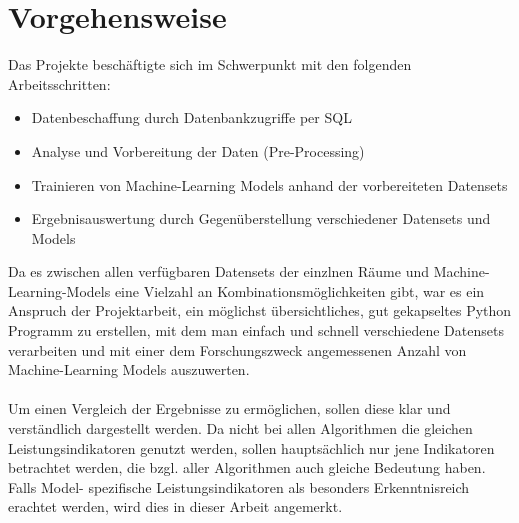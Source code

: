 \newpage

\section{Vorgehensweise}


Das Projekte beschäftigte sich im Schwerpunkt mit den folgenden Arbeitsschritten:
\begin{itemize}
    \item Datenbeschaffung durch Datenbankzugriffe per SQL
    \item Analyse und Vorbereitung der Daten (Pre-Processing)
    \item Trainieren von Machine-Learning Models anhand der vorbereiteten Datensets
    \item Ergebnisauswertung durch Gegenüberstellung verschiedener Datensets und Models
\end{itemize}
Da es zwischen allen verfügbaren Datensets der einzlnen Räume und Machine-Learning-Models eine Vielzahl an
Kombinationsmöglichkeiten gibt, war es ein Anspruch der Projektarbeit, ein möglichst übersichtliches, 
gut gekapseltes Python Programm zu erstellen, mit dem man einfach und schnell verschiedene Datensets  
verarbeiten und mit einer dem Forschungszweck angemessenen Anzahl von Machine-Learning Models auszuwerten. \\\\
Um einen Vergleich der Ergebnisse zu ermöglichen, sollen diese klar und verständlich dargestellt werden. 
Da nicht bei allen Algorithmen die gleichen Leistungsindikatoren genutzt werden, sollen hauptsächlich nur 
jene Indikatoren betrachtet werden, die bzgl. aller Algorithmen auch gleiche Bedeutung haben. Falls Model-
spezifische Leistungsindikatoren als besonders Erkenntnisreich erachtet werden, wird dies in dieser Arbeit
angemerkt.